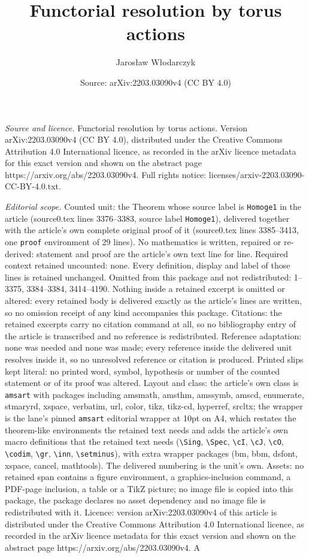 \documentclass[10pt,a4paper]{amsart}
\title[Functorial resolution by torus actions]{Functorial resolution by torus actions}
\author{Jaros{\l}aw W{\l}odarczyk}
\date{Source: arXiv:2203.03090v4 (CC BY 4.0)}
\begin{document}
\maketitle

\noindent\emph{Source and licence.} Functorial resolution by torus actions. Version arXiv:2203.03090v4 (CC BY 4.0), distributed under the Creative Commons Attribution 4.0 International licence, as recorded in the arXiv licence metadata for this exact version and shown on the abstract page https://arxiv.org/abs/2203.03090v4. Full rights notice: licenses/arxiv-2203.03090-CC-BY-4.0.txt.\par\smallskip

\noindent\textit{Editorial scope.} Counted unit: the Theorem whose source label is \texttt{Homoge1} in the article (source0.tex lines 3376--3383, source label \texttt{Homoge1}), delivered together with the article's own complete original proof of it (source0.tex lines 3385--3413, one \texttt{proof} environment of 29 lines). No mathematics is written, repaired or re-derived: statement and proof are the article's own text line for line. Required context retained uncounted: none. Every definition, display and label of those lines is retained unchanged. Omitted from this package and not redistributed: 1--3375, 3384--3384, 3414--4190. Nothing inside a retained excerpt is omitted or altered: every retained body is delivered exactly as the article's lines are written, so no omission receipt of any kind accompanies this package. Citations: the retained excerpts carry no citation command at all, so no bibliography entry of the article is transcribed and no reference is redistributed. Reference adaptation: none was needed and none was made; every reference inside the delivered unit resolves inside it, so no unresolved reference or citation is produced. Printed slips kept literal: no printed word, symbol, hypothesis or number of the counted statement or of its proof was altered. Layout and class: the article's own class is \texttt{amsart} with packages including amsmath, amsthm, amssymb, amscd, enumerate, stmaryrd, xspace, verbatim, url, color, tikz, tikz-cd, hyperref, srcltx; the wrapper is the lane's pinned \texttt{amsart} editorial wrapper at 10pt on A4, which restates the theorem-like environments the retained text needs and adds the article's own macro definitions that the retained text needs (\texttt{\textbackslash Sing}, \texttt{\textbackslash Spec}, \texttt{\textbackslash cI}, \texttt{\textbackslash cJ}, \texttt{\textbackslash cO}, \texttt{\textbackslash codim}, \texttt{\textbackslash gr}, \texttt{\textbackslash inn}, \texttt{\textbackslash setminus}), with extra wrapper packages (bm, bbm, dsfont, xspace, cancel, mathtools). The delivered numbering is the unit's own. Assets: no retained span contains a figure environment, a graphics-inclusion command, a PDF-page inclusion, a table or a TikZ picture; no image file is copied into this package, the package declares no asset dependency and no image file is redistributed with it. Licence: version arXiv:2203.03090v4 of this article is distributed under the Creative Commons Attribution 4.0 International licence, as recorded in the arXiv licence metadata for this exact version and shown on the abstract page https://arxiv.org/abs/2203.03090v4. A 
\end{document}
